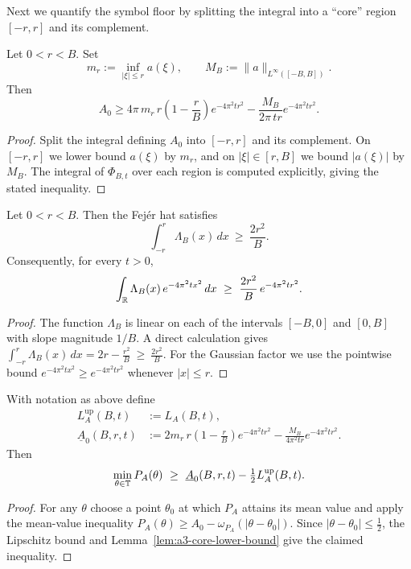 Next we quantify the symbol floor by splitting the integral into a ``core'' region $[-r,r]$ and its complement.

\begin{lemma}\label{lem:a3-core-lower-bound}
Let $0<r<B$. Set
\[
  m_r := \inf_{|\xi|\le r} a(\xi),\qquad
  M_B := \|a\|_{L^\infty([-B,B])}.
\]
Then
\[
  A_0 \ge 4\pi\,m_r\,r\left(1-\frac{r}{B}\right) e^{-4\pi^2 t r^2}
        - \frac{M_B}{2\pi\,t r} e^{-4\pi^2 t r^2}.
\]
\end{lemma}

\begin{proof}
Split the integral defining $A_0$ into $[-r,r]$ and its complement. On $[-r,r]$ we lower bound $a(\xi)$ by $m_r$, and on $|\xi|\in[r,B]$ we bound $|a(\xi)|$ by $M_B$. The integral of $\Phi_{B,t}$ over each region is computed explicitly, giving the stated inequality.
\end{proof}

\begin{lemma}\label{lem:a3-core-shift}
Let $0<r<B$. Then the Fej\'er hat satisfies
\[
  \int_{-r}^{r} \Lambda_B(x)\,dx\ \ge\ \frac{2r^2}{B}.
\]
Consequently, for every $t>0$,
\[
  \int_{\mathbb R} \Lambda_B(x)\,e^{-4\pi^2 t x^2}\,dx
  \ \ge\ \frac{2r^2}{B}\,e^{-4\pi^2 t r^2}.
\]
\end{lemma}

\begin{proof}
The function $\Lambda_B$ is linear on each of the intervals $[-B,0]$ and $[0,B]$ with slope magnitude $1/B$. A direct calculation gives
\(
\int_{-r}^{r}\Lambda_B(x)\,dx = 2r - \frac{r^2}{B}\ \ge\ \frac{2r^2}{B}.
\)
For the Gaussian factor we use the pointwise bound $e^{-4\pi^2 t x^2}\ge e^{-4\pi^2 t r^2}$ whenever $|x|\le r$.
\end{proof}

\begin{lemma}\label{lem:a3-arch-floor}
With notation as above define
\[
\begin{aligned}
  L_A^{\mathrm{up}}(B,t) &:= L_A(B,t), \\
  \underline{A}_0(B,r,t)
    &:= 2 m_r\,r\left(1-\frac{r}{B}\right) e^{-4\pi^2 t r^2}
       - \frac{M_B}{4\pi^2 t r} e^{-4\pi^2 t r^2}.
\end{aligned}
\]
Then
\[
  \min_{\theta\in\TT} P_A(\theta)\ \ge\ \underline{A}_0(B,r,t) - \tfrac12 L_A^{\mathrm{up}}(B,t).
\]
\end{lemma}

\begin{proof}
For any $\theta$ choose a point $\theta_0$ at which $P_A$ attains its mean value and apply the mean-value inequality $P_A(\theta)\ge A_0 - \omega_{P_A}(|\theta-\theta_0|)$. Since $|\theta-\theta_0|\le \tfrac12$, the Lipschitz bound and Lemma~\ref{lem:a3-core-lower-bound} give the claimed inequality.
\end{proof}


